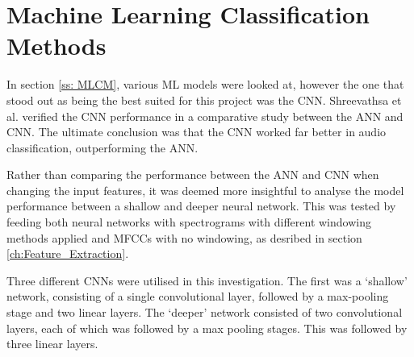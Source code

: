 \documentclass[class=report,11pt,crop=false]{standalone}
\begin{document}
\ifstandalone
\tableofcontents
\fi
\section{Machine Learning Classification Methods \label{ch:ML_Methods}}




In section \ref{ss: MLCM}, various ML models were looked at, however the one that stood out as being the best suited for this project was the CNN. Shreevathsa et al. verified the CNN performance in a comparative study between the ANN and CNN. The ultimate conclusion was that the CNN worked far better in audio classification, outperforming the ANN. 

Rather than comparing the performance between the ANN and CNN when changing the input features, it was deemed more insightful to analyse the model performance between a shallow and deeper neural network. This was tested by feeding both neural networks with spectrograms with different windowing methods applied and MFCCs with no windowing, as desribed in section \ref{ch:Feature_Extraction}. 

Three different CNNs were utilised in this investigation. The first was a `shallow' network, consisting of a single convolutional layer, followed by a max-pooling stage and two linear layers. The `deeper' network consisted of two convolutional layers, each of which was followed by a max pooling stages. This was followed by three linear layers. 
\end{document}
